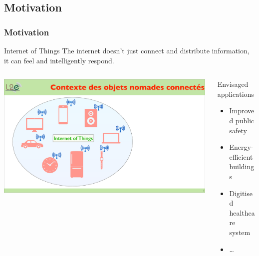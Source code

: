\documentclass[compress]{beamer}
\begin{document}
\subsection{Motivation}
\begin{frame}\frametitle{Motivation}
\vspace{-15.5pt}
\begin{block}{Internet of Things}
	The internet doesn't just connect and distribute information, it can feel and intelligently respond.
	\end{block}
\begin{columns}[totalwidth=\textwidth] 
   \begin{column}{.66\textwidth} 
   \includegraphics[width=0.99\textwidth]{Graphic/IllusIoT.pdf}
   \end{column}
   \begin{column}{.34\textwidth}
       \begin{exampleblock}{Envisaged applications} 
              \begin{itemize}[label=$\bullet$, font=\small, leftmargin=*]
				\item Improved public safety
				\item Energy-efficient buildings
				\item Digitised healthcare system
				\item \dots
			\end{itemize}
       \end{exampleblock}
   \end{column}
\end{columns}
\end{frame}
\end{document}
